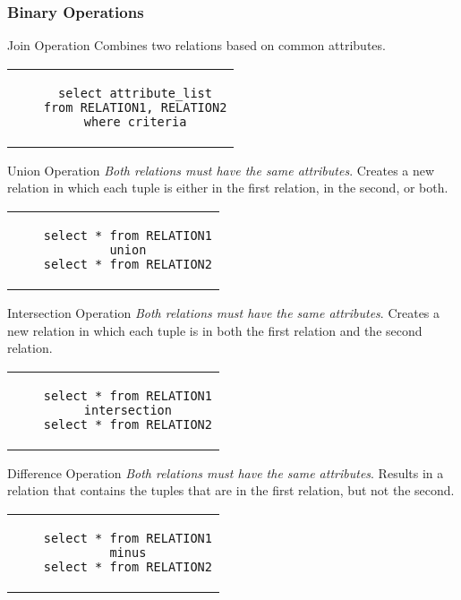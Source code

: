 \documentclass[\main/notes.tex]{subfiles}
\begin{document}
				\subsubsection{Binary Operations}
					\begin{definition}{Join Operation}
						Combines two relations based on common attributes.
						\begin{center}
							\begin{tabular}{c}
								\begin{lstlisting}
	select attribute_list
	from RELATION1, RELATION2
	where criteria
								\end{lstlisting}
							\end{tabular}
						\end{center}
					\end{definition}
					\begin{definition}{Union Operation}
						\emph{Both relations must have the same attributes}. Creates a new relation in which each tuple is either in the first relation, in the second, or both.
						\begin{center}
							\begin{tabular}{c}
								\begin{lstlisting}
	select * from RELATION1
	union
	select * from RELATION2
								\end{lstlisting}
							\end{tabular}
						\end{center}
					\end{definition}
					\begin{definition}{Intersection Operation}
						\emph{Both relations must have the same attributes}. Creates a new relation in which each tuple is in both the first relation and the second relation.
						\begin{center}
							\begin{tabular}{c}
								\begin{lstlisting}
	select * from RELATION1
	intersection
	select * from RELATION2
								\end{lstlisting}
							\end{tabular}
						\end{center}
					\end{definition}
					\pagebreak
					\begin{definition}{Difference Operation}
						\emph{Both relations must have the same attributes}. Results in a relation that contains the tuples that are in the first relation, but not the second.
						\begin{center}
							\begin{tabular}{c}
								\begin{lstlisting}
	select * from RELATION1
	minus
	select * from RELATION2
								\end{lstlisting}
							\end{tabular}
						\end{center}
					\end{definition}

\end{document}
